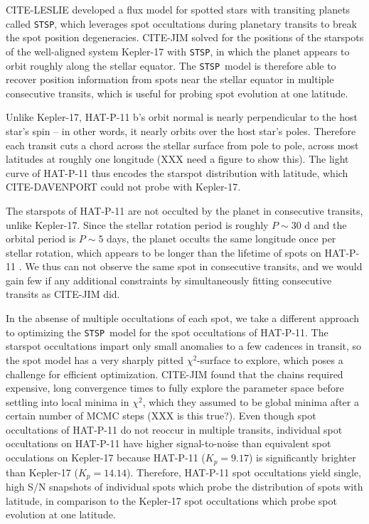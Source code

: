 \documentclass[iop]{emulateapj}
\newcommand{\stsp}{\texttt{STSP}}
\begin{document}
CITE-LESLIE developed a flux model for spotted stars with transiting planets called \stsp, which leverages spot occultations during planetary transits to break the spot position degeneracies. CITE-JIM solved for the positions of the starspots of the well-aligned system Kepler-17 with \stsp, in which the planet appears to orbit roughly along the stellar equator. The \stsp\ model is therefore able to recover position information from spots near the stellar equator in multiple consecutive transits, which is useful for probing spot evolution at one latitude. 

Unlike Kepler-17, HAT-P-11 b's orbit normal is nearly perpendicular to the host star's spin -- in other words, it nearly orbits over the host star's poles. Therefore each transit cuts a chord across the stellar surface from pole to pole, across most latitudes at roughly one longitude (XXX need a figure to show this). The light curve of HAT-P-11 thus encodes the starspot distribution with latitude, which CITE-DAVENPORT could not probe with Kepler-17.

The starspots of HAT-P-11 are not occulted by the planet in consecutive transits, unlike Kepler-17. Since the stellar rotation period is roughly $P\sim 30$ d and the orbital period is $P \sim 5$ days, the planet occults the same longitude once per stellar rotation, which appears to be longer than the lifetime of spots on HAT-P-11 \citep{Sanchis-Ojeda2011}. We thus can not observe the same spot in consecutive transits, and we would gain few if any additional constraints by simultaneously fitting consecutive transits as CITE-JIM did. 

In the absense of multiple occultations of each spot, we take a different approach to optimizing the \stsp\ model for the spot occultations of HAT-P-11. The starspot occultations impart only small anomalies to a few cadences in transit, so the spot model has a very sharply pitted $\chi^2$-surface to explore, which poses a challenge for efficient optimization. CITE-JIM found that the chains required expensive, long convergence times to fully explore the parameter space before settling into local minima in $\chi^2$, which they assumed to be global minima after a certain number of MCMC steps (XXX is this true?). Even though spot occultations of HAT-P-11 do not reoccur in multiple transits, individual spot occultations on HAT-P-11 have higher signal-to-noise than equivalent spot occulations on Kepler-17 because HAT-P-11 ($K_p = 9.17$) is significantly brighter than Kepler-17 ($K_p = 14.14$). Therefore, HAT-P-11 spot occultations yield single, high S/N snapshots of individual spots which probe the distribution of spots with latitude, in comparison to the Kepler-17 spot occultations which probe spot evolution at one latitude.
\end{document}
